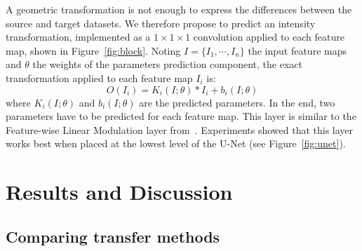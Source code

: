 A geometric transformation is not enough to express the differences between the source and target datasets. We therefore propose to predict an intensity transformation, implemented as a $1 \times 1 \times 1$ convolution applied to each feature map, shown in Figure~\ref{fig:block}. Noting $I = \{ I_1, \cdots, I_n \}$ the input feature maps and $\theta$ the weights of the parameters prediction component, the exact transformation applied to each feature map $I_i$ is:
\begin{equation*}
O \left( I_i \right) = K_i \left( I; \theta \right) * I_i + b_i \left( I; \theta \right)
\end{equation*}
where $K_i \left( I; \theta \right)$ and $b_i \left( I; \theta \right)$ are the predicted parameters. In the end, two parameters have to be predicted for each feature map. This layer is similar to the Feature-wise Linear Modulation layer from~\textcite{perez2018}. Experiments showed that this layer works best when placed at the lowest level of the U-Net (see Figure~\ref{fig:unet}).

\section{Results and Discussion}
\label{sec:kidney_res}

\subsection{Comparing transfer methods}

